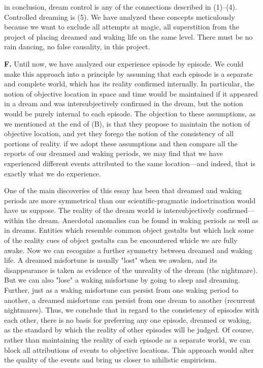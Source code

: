 \documentclass[10pt,twoside,draft]{memoir}
\begin{document}
{{{in conclusion, dream control is any of the connections described in 
(1)--(4). Controlled dreaming is (5). We have analyzed these concepts 
meticulously because we want to exclude all attempts at magic, all 
superstition from the project of placing dreamed and waking life on the same 
level. There must be no rain dancing, no false causality, in this project. 

\textbf{F.} Until now, we have analyzed our experience episode by episode. We 
could make this approach into a principle by assuming that each episode is a 
separate and complete world, which has its reality confirmed internally. In 
particular, the notion of objective location in space and time would be 
maintained if it appeared in a dream and was intersubjectively confirmed in 
the dream, but the notion would be purely internal to each episode. The 
objection to these assumptions, as we mentioned at the end of (B), is that 
they propose to maintain the notion of objective location, and yet they 
forego the notion of the consistency of all portions of reality. if we adopt 
these assumptions and then compare all the reports of our dreamed and 
waking periods, we may find that we have experienced different events 
attributed to the same location---and indeed, that is exactly what we do 
experience. 

One of the main discoveries of this essay has been that dreamed and 
waking periods are more symmetrical than our scientific-pragmatic 
indoctrination would have us suppose. The reality of the dream world is 
intersubjectively confirmed---within the dream. Anecdotal anomalies can be 
found in waking periods as well as in dreams. Entities which resemble 
common object gestalts but which lack some of the reality cues of object 
gestalts can be encountered whicle we are fully awake. Now we can 
recognize a further symmetry between dreamed and waking life. A dreamed 
misfortune is usually "lost" when we awaken, and its disappearance is taken 
as evidence of the unreality of the dream (the nightmare). But we can also 
"lose" a waking misfortune by going to sleep and dreaming. Further, just as 
a waking misfortune can persist from one waking period to another, a 
dreamed misfortune can persist from one dream to another (recurrent 
nightmares). Thus, we conclude that in regard to the consistency of episodes 
with each other, there is no basis for preferring any one episode, dreamed or 
waking, as the standard by which the reality of other episodes will be judged. 
Of course, rather than maintaining the reality of each episode as a separate 
world, we can block all attributions of events to objective locations. This 
approach would alter the quality of the events and bring us closer to 
nihilistic empiricism. 

}}}
\end{document}

